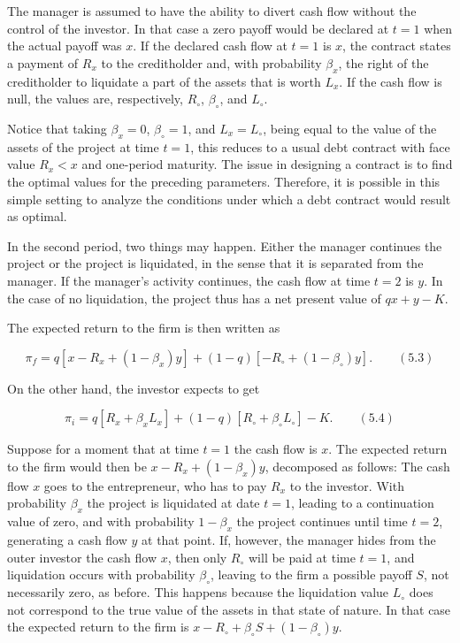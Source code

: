 \documentclass[11pt,a4paper]{article}
\begin{document}
The manager is assumed to have the ability to divert cash flow without the control of the investor.
In that case a zero payoff would be declared at \(t = 1\) when the actual payoff was \(x\). If the
declared cash flow at \(t = 1\) is \(x\), the contract states a payment of \(R_x\) to the
creditholder and, with probability \(\beta_x\), the right of the creditholder to liquidate a part of
the assets that is worth \(L_x\). If the cash flow is null, the values are, respectively,
\(R_\circ\), \(\beta_\circ\), and \(L_\circ\).

Notice that taking \(\beta_x = 0\), \(\beta_\circ = 1\), and \(L_x = L_\circ\), being equal to the
value of the assets of the project at time \(t = 1\), this reduces to a usual debt contract with
face value \(R_x < x\) and one-period maturity. The issue in designing a contract is to find the
optimal values for the preceding parameters. Therefore, it is possible in this simple setting to
analyze the conditions under which a debt contract would result as optimal.

In the second period, two things may happen. Either the manager continues the project or the project
is liquidated, in the sense that it is separated from the manager. If the manager's activity
continues, the cash flow at time \(t = 2\) is \(y\). In the case of no liquidation, the project thus
has a net present value of \(qx + y - K\).

The expected return to the firm is then written as

\[\pi_f = q[x - R_x + (1 - \beta_x)y] + (1 - q)[-R_\circ + (1 - \beta_\circ)y]. \qquad (5.3)\]

On the other hand, the investor expects to get

\[\pi_i = q[R_x + \beta_x L_x] + (1 - q)[R_\circ + \beta_\circ L_\circ] - K. \qquad (5.4)\]

Suppose for a moment that at time \(t = 1\) the cash flow is \(x\). The expected return to the firm
would then be \(x - R_x + (1 - \beta_x)y\), decomposed as follows: The cash flow \(x\) goes to the
entrepreneur, who has to pay \(R_x\) to the investor. With probability \(\beta_x\) the project is
liquidated at date \(t = 1\), leading to a continuation value of zero, and with probability
\(1 - \beta_x\) the project continues until time \(t = 2\), generating a cash flow \(y\) at that
point. If, however, the manager hides from the outer investor the cash flow \(x\), then only
\(R_\circ\) will be paid at time \(t = 1\), and liquidation occurs with probability \(\beta_\circ\),
leaving to the firm a possible payoff \(S\), not necessarily zero, as before. This happens because
the liquidation value \(L_\circ\) does not correspond to the true value of the assets in that state
of nature. In that case the expected return to the firm is
\(x - R_\circ + \beta_\circ S + (1 - \beta_\circ)y\).
\end{document}
